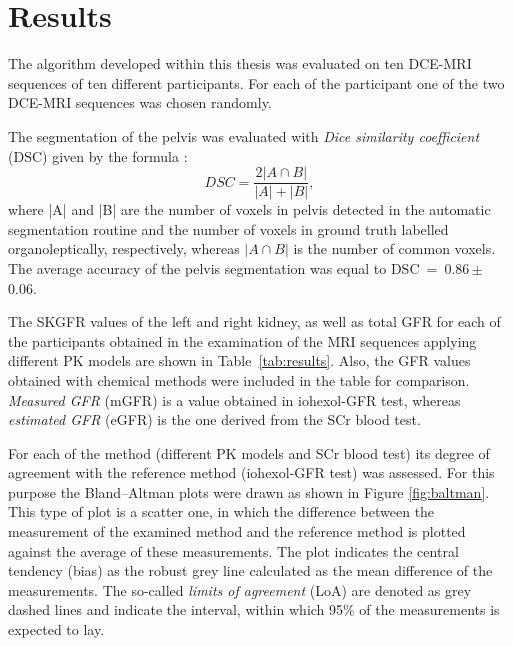 \chapter{Results}
The algorithm developed within this thesis was evaluated on ten DCE-MRI sequences of ten different participants. For each of the participant one of the two  DCE-MRI sequences was chosen randomly.

The segmentation of the pelvis was evaluated with \textit{Dice similarity coefficient} (DSC) given by the formula \cite{dice1945measures}:
\begin{equation}
	\label{eq:dice}
	DSC = \dfrac{2|A\cap{}B|}{|A|+|B|},
\end{equation}
where |A| and |B| are the number of voxels in pelvis detected  in the automatic segmentation routine and the number of voxels in ground truth labelled organoleptically, respectively, whereas $|A\cap{}B|$ is the number of common voxels.
The average accuracy of the pelvis segmentation was equal to DSC~=~0.86\,$\pm$\,0.06.

The SKGFR values of the left and right kidney, as well as total GFR for each of the participants obtained in the examination of the MRI sequences applying different PK models are shown in Table~\ref{tab:results}. Also, the GFR values obtained with chemical methods were included in the table for comparison. \textit{Measured GFR} (mGFR) is a value obtained in iohexol-GFR test, whereas \textit{estimated GFR} (eGFR) is the one derived from the SCr blood test.

For each of the method (different PK models and SCr blood test) its degree of agreement with the reference method  (iohexol-GFR test) was assessed. For this purpose the Bland–Altman plots \cite{bland1986statistical} were drawn as shown in Figure \ref{fig:baltman}. 
This type of plot is a scatter one, in which the difference between the measurement of the examined method and the reference method is plotted against the average of these measurements.
The plot indicates the central tendency (bias) as the robust grey line calculated as the mean difference of the measurements. The so-called \textit{limits of agreement} (LoA) are denoted as grey dashed lines and indicate the interval, within which 95\% of the measurements is expected to lay.

